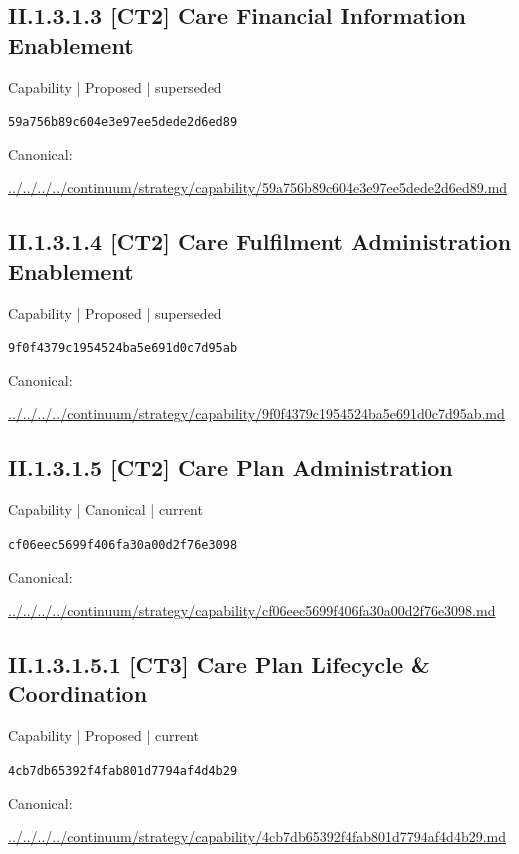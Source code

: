 \documentclass[10pt,a4paper]{article}
\begin{document}
\subsection*{II.1.3.1.3 [CT2] Care Financial Information Enablement}
{\small Capability | Proposed | superseded}\par
\texttt{59a756b89c604e3e97ee5dede2d6ed89}\par
Canonical: \par
{\footnotesize\url{../../../../continuum/strategy/capability/59a756b89c604e3e97ee5dede2d6ed89.md}}\par
\subsection*{II.1.3.1.4 [CT2] Care Fulfilment Administration Enablement}
{\small Capability | Proposed | superseded}\par
\texttt{9f0f4379c1954524ba5e691d0c7d95ab}\par
Canonical: \par
{\footnotesize\url{../../../../continuum/strategy/capability/9f0f4379c1954524ba5e691d0c7d95ab.md}}\par
\subsection*{II.1.3.1.5 [CT2] Care Plan Administration}
{\small Capability | Canonical | current}\par
\texttt{cf06eec5699f406fa30a00d2f76e3098}\par
Canonical: \par
{\footnotesize\url{../../../../continuum/strategy/capability/cf06eec5699f406fa30a00d2f76e3098.md}}\par
\subsection*{II.1.3.1.5.1 [CT3] Care Plan Lifecycle \& Coordination}
{\small Capability | Proposed | current}\par
\texttt{4cb7db65392f4fab801d7794af4d4b29}\par
Canonical: \par
{\footnotesize\url{../../../../continuum/strategy/capability/4cb7db65392f4fab801d7794af4d4b29.md}}\par
\end{document}

